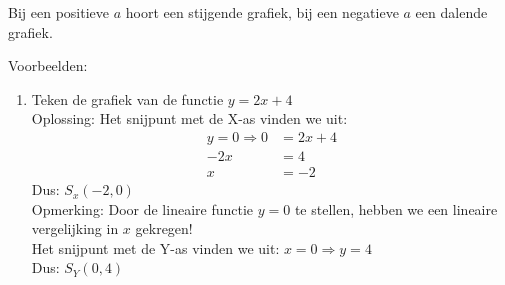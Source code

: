Bij een positieve $a$ hoort een stijgende grafiek, bij een negatieve $a$ een dalende grafiek.

Voorbeelden:
\begin{enumerate}
    \itemsep1em
    \item Teken de grafiek van de functie $y=2x+4$ \\
        Oplossing: Het snijpunt met de X-as vinden we uit: 
        \begin{align*}
            y=0 \Rightarrow 0&=2x+4 \\
            -2x&=4 \\
              x&=-2
        \end{align*}
        Dus: $S_x (-2,0)$ \\
        
        Opmerking: Door de lineaire functie $y=0$ te stellen, hebben we een lineaire vergelijking in $x$ gekregen! \\
        Het snijpunt met de Y-as vinden we uit: $x=0 \Rightarrow y=4$ \\
        
        Dus: $S_Y (0,4)$ \\
        \begin{figure}[H]
            \centering
\end{figure}
\end{enumerate}
